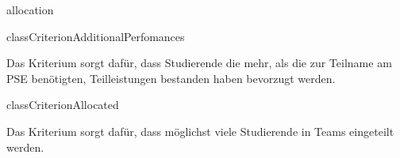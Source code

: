 \begin{texdocpackage}{allocation}
\begin{texdocclass}{class}{CriterionAdditionalPerfomances}
\label{texdoclet:allocation.CriterionAdditionalPerfomances}
\begin{texdocclassintro}
Das Kriterium sorgt dafür, dass Studierende die mehr, als die zur Teilname am
 PSE benötigten, Teilleistungen bestanden haben bevorzugt werden.\end{texdocclassintro}
\begin{texdocclassconstructors}
\end{texdocclassconstructors}
\begin{texdocclassmethods}
\end{texdocclassmethods}
\end{texdocclass}


\begin{texdocclass}{class}{CriterionAllocated}
\label{texdoclet:allocation.CriterionAllocated}
\begin{texdocclassintro}
Das Kriterium sorgt dafür, dass möglichst viele Studierende in Teams
 eingeteilt werden.\end{texdocclassintro}
\begin{texdocclassconstructors}
\end{texdocclassconstructors}
\begin{texdocclassmethods}
\end{texdocclassmethods}
\end{texdocclass}



\end{texdocpackage}
